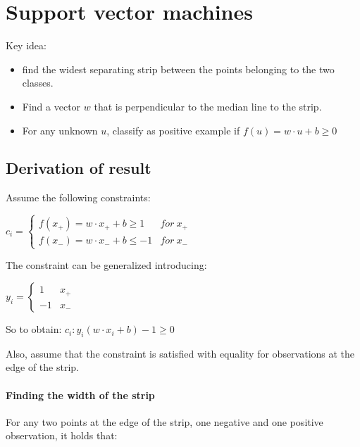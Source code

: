 
\section{Support vector machines}

Key idea:
\begin{itemize}
  \item find the widest separating strip between the points
belonging to the two classes.
  \item Find a vector $w$ that is perpendicular to the median line to the
strip.
  \item For any unknown $u$, classify as positive example if 
    $f(u) = w\cdot u + b \geq 0$
\end{itemize}

\subsection{Derivation of result}

Assume the following constraints:

\begin{math}
  c_i = \begin{cases}
    f(x_{+}) = w \cdot x_{+} + b \geq 1 & for \medspace x_{+} \\
    f(x_{-}) = w \cdot x_{-} + b \leq -1 & for \medspace x_{-} 
  \end{cases}
\end{math}

The constraint can be generalized introducing:

\begin{math}
  y_i = \begin{cases}
    1 & x_{+} \\
    -1 & x_{-}
  \end{cases}
\end{math}

So to obtain:
\begin{math}
  c_i: y_i(w \cdot x_i + b) - 1 \geq 0
\end{math}

Also, assume that the constraint is satisfied with equality for
observations at the edge of the strip.

\paragraph{Finding the width of the strip} For any two points at
the edge of the strip, one negative and one positive observation,
it holds that:

